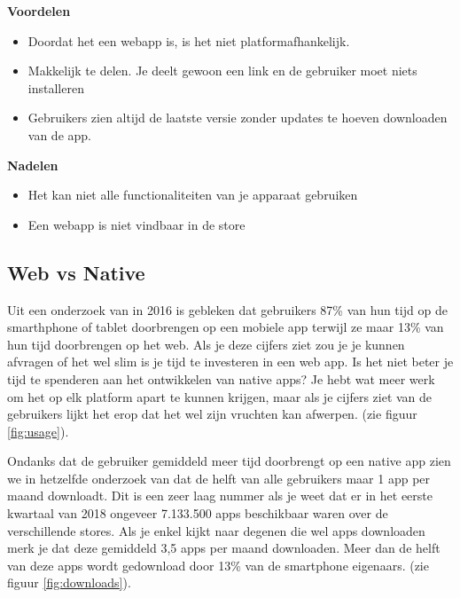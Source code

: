\begin{minipage}[t]{0.5\textwidth}
	\textbf{Voordelen}
	\begin{itemize}  
		\item Doordat het een webapp is, is het niet platformafhankelijk. 
		\item Makkelijk te delen. Je deelt gewoon een link en de gebruiker moet niets installeren
		\item Gebruikers zien altijd de laatste versie zonder updates te hoeven downloaden van de app.
	\end{itemize}
\end{minipage}
\begin{minipage}[t]{0.5\textwidth}
	\textbf{Nadelen}
	\begin{itemize}  
		\item Het kan niet alle functionaliteiten van je apparaat gebruiken
		\item Een webapp is niet vindbaar in de store
	\end{itemize}
\end{minipage}


\subsection{Web vs Native}
Uit een onderzoek van \textcite{comScore} in 2016 is gebleken  dat gebruikers 87\% van hun tijd op de smarthphone of tablet doorbrengen op een mobiele app terwijl ze maar 13\% van hun tijd doorbrengen op het web. Als je deze cijfers ziet zou je je kunnen afvragen of het wel slim is je tijd te investeren in een web app. Is het niet beter je tijd te spenderen aan het ontwikkelen van native apps? Je hebt wat meer werk om het op elk platform apart te kunnen krijgen, maar als je cijfers ziet van de gebruikers lijkt het erop dat het wel zijn vruchten kan afwerpen.
(zie figuur \ref{fig:usage}). 

Ondanks dat de gebruiker gemiddeld meer tijd doorbrengt op een native app zien we in hetzelfde onderzoek van \textcite{comScore}  dat de helft van alle gebruikers maar 1 app per maand downloadt. Dit is een zeer laag nummer als je weet dat er in het eerste kwartaal van 2018 ongeveer 7.133.500 apps beschikbaar waren over de verschillende stores. Als je enkel kijkt naar degenen die wel apps downloaden merk je dat deze gemiddeld 3,5 apps per maand downloaden. Meer dan de helft van deze apps wordt gedownload door 13\% van de smartphone eigenaars. (zie figuur \ref{fig:downloads}).

